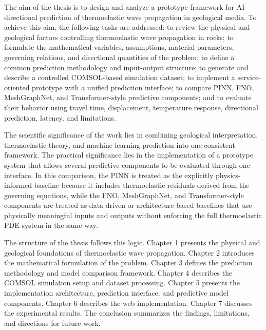 The aim of the thesis is to design and analyze a prototype framework for AI directional prediction of thermoelastic wave propagation in geological media. To achieve this aim, the following tasks are addressed: to review the physical and geological factors controlling thermoelastic wave propagation in rocks; to formulate the mathematical variables, assumptions, material parameters, governing relations, and directional quantities of the problem; to define a common prediction methodology and input-output structure; to generate and describe a controlled COMSOL-based simulation dataset; to implement a service-oriented prototype with a unified prediction interface; to compare PINN, FNO, MeshGraphNet, and Transformer-style predictive components; and to evaluate their behavior using travel time, displacement, temperature response, directional prediction, latency, and limitations.

The scientific significance of the work lies in combining geological interpretation, thermoelastic theory, and machine-learning prediction into one consistent framework. The practical significance lies in the implementation of a prototype system that allows several predictive components to be evaluated through one interface. In this comparison, the PINN is treated as the explicitly physics-informed baseline because it includes thermoelastic residuals derived from the governing equations, while the FNO, MeshGraphNet, and Transformer-style components are treated as data-driven or architecture-based baselines that use physically meaningful inputs and outputs without enforcing the full thermoelastic PDE system in the same way.

The structure of the thesis follows this logic. Chapter 1 presents the physical and geological foundations of thermoelastic wave propagation. Chapter 2 introduces the mathematical formulation of the problem. Chapter 3 defines the prediction methodology and model comparison framework. Chapter 4 describes the COMSOL simulation setup and dataset processing. Chapter 5 presents the implementation architecture, prediction interface, and predictive model components. Chapter 6 describes the web implementation. Chapter 7 discusses the experimental results. The conclusion summarizes the findings, limitations, and directions for future work.
